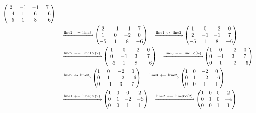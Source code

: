 \documentclass{ltjsarticle}
\begin{document}
\begin{align*}
\begin{pmatrix}
 2 & -1 & -1 & 7\\
 - 4 & 1 & 6 & - 6\\
 - 5 & 1 & 8 & - 6
\end{pmatrix}\allowdisplaybreaks\\
&\ \ \ \xrightarrow{ \text{line} 2 \ -=\  \text{line} 3 } %
\begin{pmatrix}
 2 & -1 & -1 & 7\\
 1 & 0 & - 2 & 0\\
 - 5 & 1 & 8 & - 6
\end{pmatrix}\ \ \ \xrightarrow{ \text{line} 1 \ \leftrightarrow\  \text{line} 2 } %
\begin{pmatrix}
 1 & 0 & - 2 & 0\\
 2 & -1 & -1 & 7\\
 - 5 & 1 & 8 & - 6
\end{pmatrix}\allowdisplaybreaks\\
 &\ \ \ \xrightarrow{ \text{line} 2 \ -=\  \text{line} 1 \times\left( 2 \right)} %
\begin{pmatrix}
 1 & 0 & - 2 & 0\\
 0 & -1 & 3 & 7\\
 - 5 & 1 & 8 & - 6
\end{pmatrix}\ \ \ \xrightarrow{ \text{line} 3 \ +=\  \text{line} 1 \times\left( 5 \right)} %
\begin{pmatrix}
 1 & 0 & - 2 & 0\\
 0 & -1 & 3 & 7\\
 0 & 1 & - 2 & - 6
\end{pmatrix}\allowdisplaybreaks\\
 &\ \ \ \xrightarrow{ \text{line} 2 \ \leftrightarrow\  \text{line} 3 } %
\begin{pmatrix}
 1 & 0 & - 2 & 0\\
 0 & 1 & - 2 & - 6\\
 0 & -1 & 3 & 7
\end{pmatrix}\ \ \ \xrightarrow{ \text{line} 3 \ +=\  \text{line} 2 } %
\begin{pmatrix}
 1 & 0 & - 2 & 0\\
 0 & 1 & - 2 & - 6\\
 0 & 0 & 1 & 1
\end{pmatrix}\allowdisplaybreaks\\
 &\ \ \ \xrightarrow{ \text{line} 1 \ +=\  \text{line} 3 \times\left( 2 \right)} %
\begin{pmatrix}
 1 & 0 & 0 & 2\\
 0 & 1 & - 2 & - 6\\
 0 & 0 & 1 & 1
\end{pmatrix}\ \ \ \xrightarrow{ \text{line} 2 \ +=\  \text{line} 3 \times\left( 2 \right)} %
\begin{pmatrix}
 1 & 0 & 0 & 2\\
 0 & 1 & 0 & - 4\\
 0 & 0 & 1 & 1
\end{pmatrix}
\end{align*}
\end{document}
